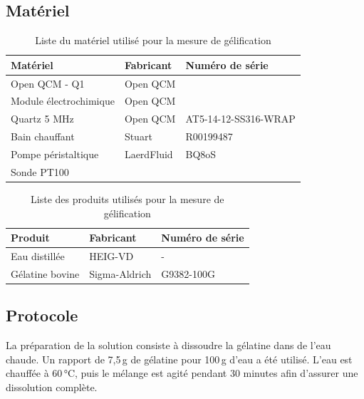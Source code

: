 \subsection{Matériel}

\begin{table}[H]
    \centering
    \begin{tabular}{|l|l|l|}
        \hline
        \textbf{Matériel}         & \textbf{Fabricant}   & \textbf{Numéro de série} \\
        \hline
        Open QCM - Q1             & Open QCM              &   \\
        Module électrochimique    & Open QCM              &   \\
        Quartz 5 MHz             & Open QCM              &   AT5-14-12-SS316-WRAP\\
        Bain chauffant            & Stuart                &  R00199487 \\
        Pompe péristaltique       & LaerdFluid            &  BQ8oS \\
        Sonde PT100               &                       &   \\
        \hline
    \end{tabular}
    \caption{Liste du matériel utilisé pour la mesure de gélification}
    \label{tab:materielGelification}
\end{table}

\begin{table}[H]
    \centering
    \begin{tabular}{|l|l|l|}
        \hline
        \textbf{Produit} & \textbf{Fabricant}   & \textbf{Numéro de série} \\
        \hline
        Eau distillée    & HEIG-VD              &   -           \\
        Gélatine bovine  & Sigma-Aldrich        &   G9382-100G  \\
        \hline
    \end{tabular}
    \caption{Liste des produits utilisés pour la mesure de gélification}
\end{table}

\subsection{Protocole}


La préparation de la solution consiste à dissoudre la gélatine dans de l’eau chaude. Un rapport de 7,5 g de gélatine pour 100 g d’eau a été utilisé. L’eau est chauffée à 60 °C, puis le mélange est agité pendant 30 minutes afin d’assurer une dissolution complète.

